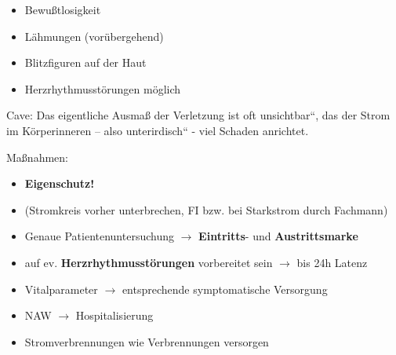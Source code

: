 \documentclass{article}
\newcommand\gEs[1]{\textbf{\textcolor[rgb]{0.0,0.0,0.5019608}{#1}}}
\newcommand\gEs[1]{\textbf{\textcolor[rgb]{0.0,0.0,0.5019608}{#1}}}
\begin{document}
\begin{itemize}
\item {\mdseries
Bewu{\ss}tlosigkeit}

\item {\mdseries
L\"ahmungen (vor\"ubergehend)}

\item {\mdseries
Blitzfiguren auf der Haut}

\item {\mdseries
Herzrhythmusst\"orungen m\"oglich}

\end{itemize}
{\mdseries
Cave: Das eigentliche Ausma{\ss} der Verletzung ist oft
{\quotedblbase}unsichtbar{\textquotedblleft}, das der Strom im
K\"orperinneren -- also {\quotedblbase}unterirdisch{\textquotedblleft}
- viel Schaden anrichtet. }

{\mdseries\color{black}
Ma{\ss}nahmen:}

\begin{itemize}
\item {\mdseries\color[rgb]{0.0,0.0,0.5019608}
\gEs{Eigenschutz!} }

\end{itemize}
\begin{itemize}
\item {\mdseries
(Stromkreis  vorher  unterbrechen, FI bzw. bei Starkstrom durch 
Fachmann)}

\end{itemize}
\begin{itemize}
\item {\mdseries\color[rgb]{0.0,0.0,0.5019608}
Genaue  Patientenuntersuchung ${\rightarrow}$ \textbf{Eintritts}{}-  und
\textbf{Austrittsmarke}}

\item {\mdseries\color[rgb]{0.0,0.0,0.5019608}
auf ev. \textbf{Herzrhythmusst\"orungen }vorbereitet  sein
${\rightarrow}$ bis 24h Latenz}

\item {\mdseries\color[rgb]{0.0,0.0,0.5019608}
Vitalparameter ${\rightarrow}$ entsprechende  symptomatische Versorgung}

\item {\mdseries\color[rgb]{0.0,0.0,0.5019608}
NAW ${\rightarrow}$ Hospitalisierung}

\item {\mdseries\color[rgb]{0.0,0.0,0.5019608}
Stromverbrennungen wie Verbrennungen  versorgen}

\end{itemize}
\end{document}
